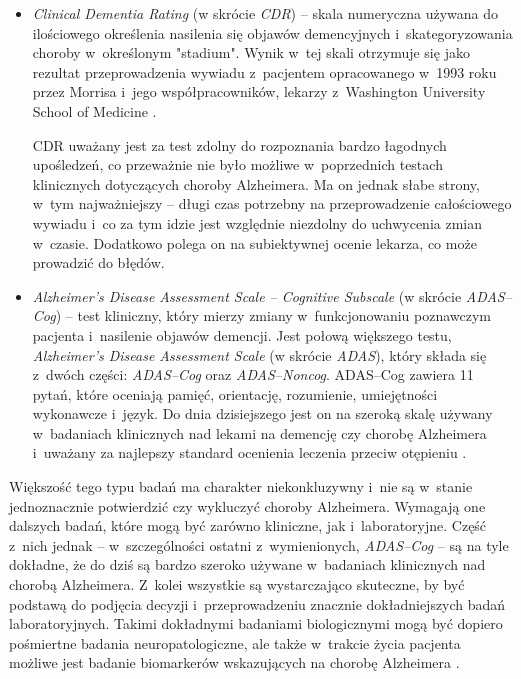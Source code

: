 {\begin{itemize}
  \item \emph{Clinical Dementia Rating} (w skrócie \emph{CDR}) -- skala numeryczna używana do ilościowego określenia nasilenia się objawów demencyjnych i~skategoryzowania choroby w~określonym "stadium".
        Wynik w~tej skali otrzymuje się jako rezultat przeprowadzenia wywiadu z~pacjentem opracowanego w~1993 roku przez Morrisa i~jego współpracowników, lekarzy z~Washington University School of Medicine \cite{morris1993clinical}.

        CDR uważany jest za test zdolny do rozpoznania bardzo łagodnych upośledzeń, co przeważnie nie było możliwe w~poprzednich testach klinicznych dotyczących choroby Alzheimera.
        Ma on jednak słabe strony, w~tym najważniejszy -- długi czas potrzebny na przeprowadzenie całościowego wywiadu i~co za tym idzie jest względnie niezdolny do uchwycenia zmian w~czasie.
        Dodatkowo polega on na subiektywnej ocenie lekarza, co może prowadzić do błędów.

  \item \emph{Alzheimer's Disease Assessment Scale -- Cognitive Subscale} (w skrócie \emph{ADAS--Cog}) -- test kliniczny, który mierzy zmiany w~funkcjonowaniu poznawczym pacjenta i~nasilenie objawów demencji.
        Jest połową większego testu, \emph{Alzheimer's Disease Assessment Scale} (w skrócie \emph{ADAS}), który składa się z~dwóch części: \emph{ADAS--Cog} oraz \emph{ADAS--Noncog}.
        ADAS--Cog zawiera 11 pytań, które oceniają pamięć, orientację, rozumienie, umiejętności wykonawcze i~język.
        Do dnia dzisiejszego jest on na szeroką skalę używany w~badaniach klinicznych nad lekami na demencję czy chorobę Alzheimera i~uważany za najlepszy standard ocenienia leczenia przeciw otępieniu \cite{connor2008administration}.

\end{itemize}

Większość tego typu badań ma charakter niekonkluzywny i~nie są w~stanie jednoznacznie potwierdzić czy wykluczyć choroby Alzheimera.
Wymagają one dalszych badań, które mogą być zarówno kliniczne, jak i~laboratoryjne.
Część z~nich jednak -- w~szczególności ostatni z~wymienionych, \emph{ADAS--Cog} -- są na tyle dokładne, że do dziś są bardzo szeroko używane w~badaniach klinicznych nad chorobą Alzheimera.
Z~kolei wszystkie są wystarczająco skuteczne, by być podstawą do podjęcia decyzji i~przeprowadzeniu znacznie dokładniejszych badań laboratoryjnych.
Takimi dokładnymi badaniami biologicznymi mogą być dopiero pośmiertne badania neuropatologiczne, ale także w~trakcie życia pacjenta możliwe jest badanie biomarkerów wskazujących na chorobę Alzheimera \cite{mantzavinos2017biomarkers}.

}
